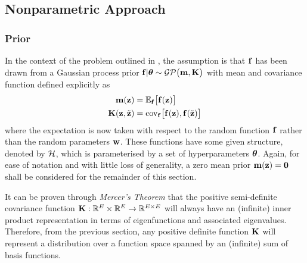 \subsection{Nonparametric Approach}
\subsubsection{Prior}
In the context of the problem outlined in , the assumption is that $\mathbf{f}$ has been drawn from a Gaussian process prior $\mathbf{f}|\boldsymbol{\theta} \sim \mathcal{GP}\big(\mathbf{m}, \mathbf{K} \big)$ with mean and covariance function defined explicitly as
\begin{align}
\mathbf{m}(\mathbf{z}) &= \mathbb{E}_{\mathbf{f}}\big[ \mathbf{f}(\mathbf{z}) \big]  \\
\mathbf{K}(\mathbf{z},\tilde{\mathbf{z}}) &= \mathrm{cov}_{\mathbf{f}}\big[\mathbf{f}(\mathbf{z}), \mathbf{f}(\tilde{\mathbf{z}}) \big]
\end{align}
where the expectation is now taken with respect to the random function $\mathbf{f}$ rather than the random parameters $\mathbf{w}$. These functions have some given structure, denoted by $\mathcal{H}$, which is parameterised by a set of hyperparameters $\boldsymbol{\theta}$. Again, for ease of notation and with little loss of generality, a zero mean prior $\mathbf{m}(\mathbf{z}) = \mathbf{0}$ shall be considered for the remainder of this section.

It can be proven through \textit{Mercer's Theorem} that the positive semi-definite covariance function $\mathbf{K}:\mathbb{R}^{E} \times \mathbb{R}^{E} \rightarrow \mathbb{R}^{E\times E}$ will always have an (infinite) inner product representation in terms of eigenfunctions and associated eigenvalues. Therefore, from the previous section, any positive definite function $\mathbf{K}$ will represent a distribution over a function space spanned by an (infinite) sum of basis functions. 



